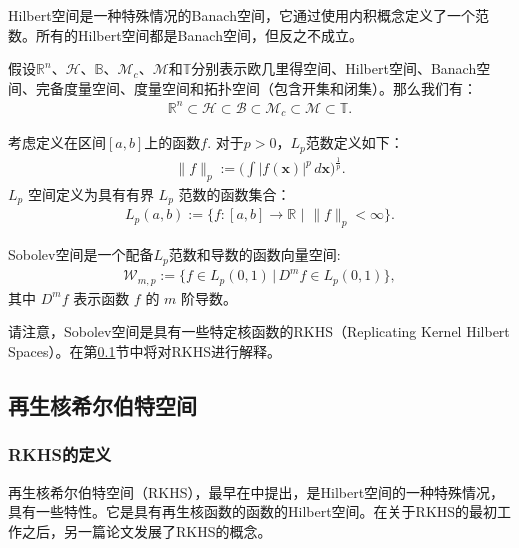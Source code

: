 \documentclass[lang=cn,10pt]{gorgeousnbook}
\numberwithin{equation}{section}%
\numberwithin{figure}{section}%
\begin{document}
\begin{remark}
Hilbert空间是一种特殊情况的Banach空间，它通过使用内积概念定义了一个范数。所有的Hilbert空间都是Banach空间，但反之不成立。
\end{remark}
假设$\mathbb{R}^n$、$\mathcal{H}$、$\mathbb{B}$、$\mathcal{M}_c$、$\mathcal{M}$和$\mathbb{T}$分别表示欧几里得空间、Hilbert空间、Banach空间、完备度量空间、度量空间和拓扑空间（包含开集和闭集）。那么我们有：
\begin{align}
\mathbb{R}^n \subset \mathcal{H} \subset \mathcal{B} \subset \mathcal{M}_c \subset \mathcal{M} \subset \mathbb{T}.
\end{align}

\begin{definition}[$L_p$ Space]
考虑定义在区间$[a, b]$上的函数$f$. 对于$p >0$，$L_p$范数定义如下：
\begin{align}
\|f\|_p := \Big(\int |f(\boldsymbol{x})|^p\, d\boldsymbol{x}\Big)^{\frac{1}{p}}.
\end{align}
$L_p$ 空间定义为具有有界 $L_p$ 范数的函数集合：
\begin{align}
L_p(a,b) := \{f:[a,b] \rightarrow \mathbb{R}\,\, |\,\, \|f\|_p < \infty \}.
\end{align}
\end{definition}

\begin{definition}
Sobolev空间是一个配备$L_p$范数和导数的函数向量空间: 
\begin{align}
\mathcal{W}_{m,p} := \{f \in L_p(0,1)\, |\, D^m f \in L_p(0,1) \},
\end{align}
其中 $D^m f$ 表示函数 $f$ 的 $m$ 阶导数。
\end{definition}
请注意，Sobolev空间是具有一些特定核函数的RKHS（Replicating Kernel Hilbert Spaces）\cite{novak2018reproducing}。在第\ref{section_RKHS}节中将对RKHS进行解释。

\subsection{再生核希尔伯特空间}\label{section_RKHS}

\subsubsection{RKHS的定义}

再生核希尔伯特空间（RKHS），最早在\cite{aronszajn1950theory}中提出，是Hilbert空间的一种特殊情况，具有一些特性。它是具有再生核函数的函数的Hilbert空间\cite{berlinet2011reproducing}。在关于RKHS的最初工作\cite{aronszajn1950theory}之后，另一篇论文\cite{aizerman1964theoretical}发展了RKHS的概念。
\end{document}
